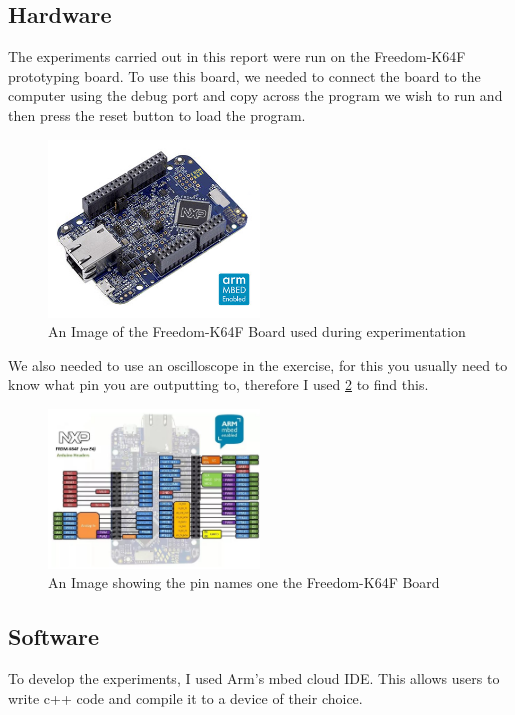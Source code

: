 \documentclass[a4paper,12pt]{scrartcl}
\begin{document}
	{
		\subsection{Hardware}{
			The experiments carried out in this report were run on the Freedom-K64F prototyping board\cite{nxpproducts2014}. To use this board, we needed to connect the board to the computer using the debug port and copy across the program we wish to run and then press the reset button to load the program.
			\begin{figure}[h]
				\centering
				\includegraphics[width=0.5\textwidth]{FRDM-K64F-ANGLE}
				\caption{An Image of the Freedom-K64F Board used during experimentation\cite{nxpproducts2014}}
				\label{img:FRDM-K64F}
			\end{figure}
			We also needed to use an oscilloscope in the exercise, for this you usually need to know what pin you are outputting to, therefore I used \cref{img:pinout} to find this.
			\begin{figure}[h]
				\centering
				\includegraphics[width=0.5\textwidth]{frdm_k64f_reve4_header_pinout}
				\caption{An Image showing the pin names one the Freedom-K64F Board\cite{armlimited2015}}
				\label{img:pinout}
			\end{figure}
		}
		\subsection{Software}
		{
			To develop the experiments, I used Arm's mbed cloud IDE. This allows users to write c++ code and compile it to a device of their choice. 
		}
	}
	
\end{document}
